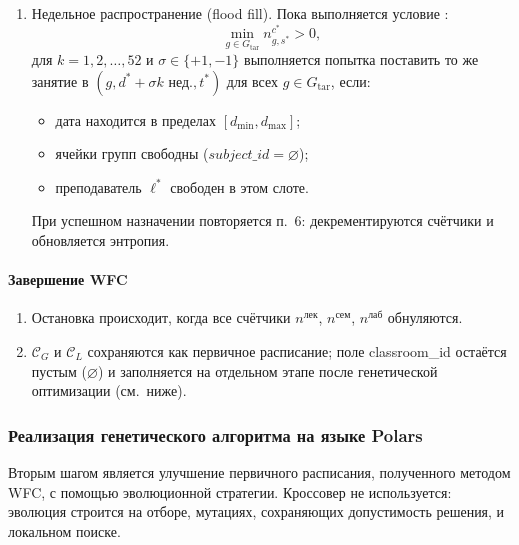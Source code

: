 \begin{enumerate}
	\item Недельное распространение (flood fill).
	Пока выполняется условие :
	\begin{equation}
		\min_{g\in G_{\mathrm{tar}}} n^{c^{*}}_{g,s^{*}}>0,
		\label{eq:wfc-flood-condition}
	\end{equation}
	для $k=1,2,\ldots,52$ и $\sigma\in\{+1,-1\}$ выполняется попытка
	поставить то же занятие в $(g,d^{*}+\sigma k\text{ нед.},t^{*})$
	для всех $g\in G_{\mathrm{tar}}$, если:
	\begin{itemize}
		\item дата находится в пределах $[d_{\min},d_{\max}]$;
		\item ячейки групп свободны ($subject\_id=\varnothing$);
		\item преподаватель $\ell^{*}$ свободен в этом слоте.
	\end{itemize}
	При успешном назначении повторяется п.~6:
	декрементируются счётчики и обновляется энтропия.
\end{enumerate}

\paragraph{Завершение WFC}

\begin{enumerate}
	\item Остановка происходит, когда все счётчики
	$n^{\mathrm{лек}}$, $n^{\mathrm{сем}}$, $n^{\mathrm{лаб}}$
	обнуляются.

	\item $\mathcal{C}_G$ и $\mathcal{C}_L$ сохраняются как первичное
	расписание; поле classroom\_id остаётся пустым
	($\varnothing$) и заполняется на отдельном этапе после
	генетической оптимизации (см.~ниже).
\end{enumerate}

\subsubsection{Реализация генетического алгоритма на языке Polars}

Вторым шагом является улучшение первичного расписания, полученного
методом WFC, с помощью эволюционной стратегии.
Кроссовер не используется: эволюция строится на отборе,
мутациях, сохраняющих допустимость решения, и локальном поиске.

